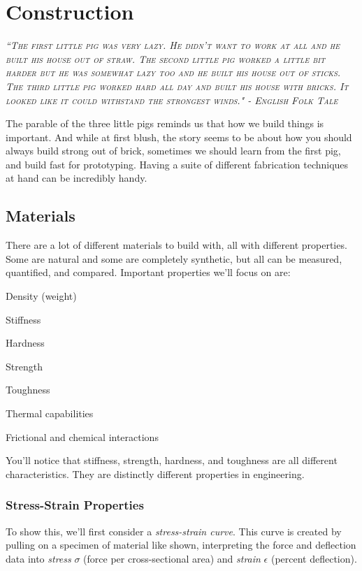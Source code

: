 
\chapter{Construction}
 
 {\slshape \scshape ``The first little pig was very lazy. He didn't want to work at all and he built his house out of straw. The second little pig worked a little bit harder but he was somewhat lazy too and he built his house out of sticks. The third little pig worked hard all day and built his house with bricks. It looked like it could withstand the strongest winds." - English Folk Tale}
 
 The parable of the three little pigs reminds us that how we build things is important. And while at first blush, the story seems to be about how you should always build strong out of brick, sometimes we should learn from the first pig, and build fast for prototyping. Having a suite of different fabrication techniques at hand can be incredibly handy.
 
 \section{Materials}
 
 There are a lot of different materials to build with, all with different properties. Some are natural and some are completely synthetic, but all can be measured, quantified, and compared. Important properties we'll focus on are:
 
 \begin{compactitem}
 	\item Density (weight)
 	\item Stiffness
 	\item Hardness
 	\item Strength
 	\item Toughness
 	\item Thermal capabilities
 	\item Frictional and chemical interactions
 \end{compactitem}
 
 You'll notice that stiffness, strength, hardness, and toughness are all different characteristics. They are distinctly different properties in engineering.
 
 \subsection{Stress-Strain Properties}
 To show this, we'll first consider a \textit{stress-strain curve}. This curve is created by pulling on a specimen of material like shown, interpreting the force and deflection data into \textit{stress} $\sigma$ (force per cross-sectional area) and \textit{strain} $\epsilon$ (percent deflection).
 
